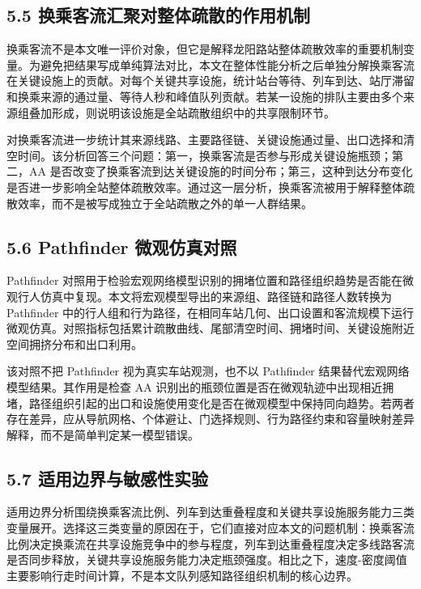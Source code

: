 \documentclass[UTF8,a4paper,12pt]{ctexart}
\begin{document}
\subsection{5.5 换乘客流汇聚对整体疏散的作用机制}

换乘客流不是本文唯一评价对象，但它是解释龙阳路站整体疏散效率的重要机制变量。为避免把结果写成单纯算法对比，本文在整体性能分析之后单独分解换乘客流在关键设施上的贡献。对每个关键共享设施，统计站台等待、列车到达、站厅滞留和换乘来源的通过量、等待人秒和峰值队列贡献。若某一设施的排队主要由多个来源组叠加形成，则说明该设施是全站疏散组织中的共享限制环节。

对换乘客流进一步统计其来源线路、主要路径链、关键设施通过量、出口选择和清空时间。该分析回答三个问题：第一，换乘客流是否参与形成关键设施瓶颈；第二，AA 是否改变了换乘客流到达关键设施的时间分布；第三，这种到达分布变化是否进一步影响全站整体疏散效率。通过这一层分析，换乘客流被用于解释整体疏散效率，而不是被写成独立于全站疏散之外的单一人群结果。

\subsection{5.6 Pathfinder 微观仿真对照}

Pathfinder 对照用于检验宏观网络模型识别的拥堵位置和路径组织趋势是否能在微观行人仿真中复现。本文将宏观模型导出的来源组、路径链和路径人数转换为 Pathfinder 中的行人组和行为路径，在相同车站几何、出口设置和客流规模下运行微观仿真。对照指标包括累计疏散曲线、尾部清空时间、拥堵时间、关键设施附近空间拥挤分布和出口利用。

该对照不把 Pathfinder 视为真实车站观测，也不以 Pathfinder 结果替代宏观网络模型结果。其作用是检查 AA 识别出的瓶颈位置是否在微观轨迹中出现相近拥堵，路径组织引起的出口和设施使用变化是否在微观模型中保持同向趋势。若两者存在差异，应从导航网格、个体避让、门选择规则、行为路径约束和容量映射差异解释，而不是简单判定某一模型错误。

\subsection{5.7 适用边界与敏感性实验}

适用边界分析围绕换乘客流比例、列车到达重叠程度和关键共享设施服务能力三类变量展开。选择这三类变量的原因在于，它们直接对应本文的问题机制：换乘客流比例决定换乘流在共享设施竞争中的参与程度，列车到达重叠程度决定多线路客流是否同步释放，关键共享设施服务能力决定瓶颈强度。相比之下，速度-密度阈值主要影响行走时间计算，不是本文队列感知路径组织机制的核心边界。
\end{document}
